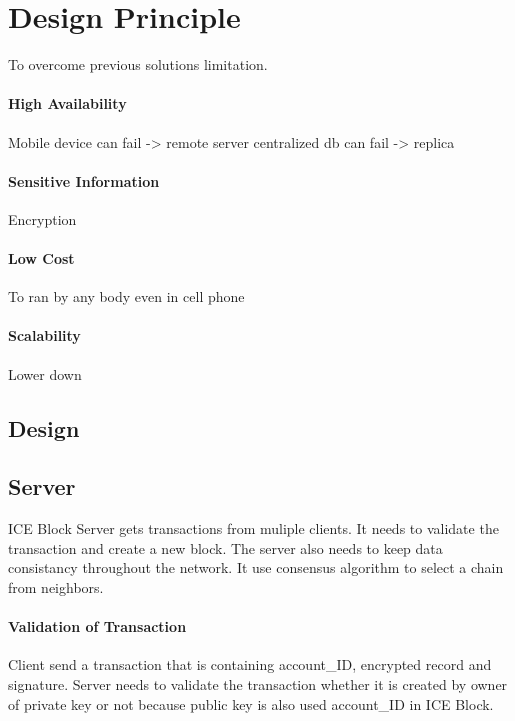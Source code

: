 \documentclass[conference]{IEEEtran}
\begin{document}
\section{Design Principle}
To overcome previous solutions limitation.
 

\paragraph{High Availability}
Mobile device can fail -> remote server
centralized db can fail -> replica

\paragraph{Sensitive Information}
Encryption

\paragraph{Low Cost}
To ran by any body even in cell phone

\paragraph{Scalability}
Lower down 


\subsection{Design}






\subsection{Server}
ICE Block Server gets transactions from muliple clients. It needs to validate the transaction and create a new block.
The server also needs to keep data consistancy throughout the network. It use consensus algorithm to select a chain from neighbors.

\paragraph{Validation of Transaction} 
Client send a transaction that is containing account\_ID, encrypted record and signature.
Server needs to validate the transaction whether it is created by owner of private key or not because public key is also used account\_ID in ICE Block.
\end{document}
